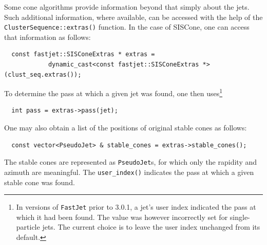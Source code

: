 \documentclass[12pt,a4]{article}
\newcommand{\fastjet}{\texttt{FastJet}\xspace}
\newcommand{\ttt}[1]{{\small\texttt{#1}}}
\begin{document}
% 
% 
% 
% 
% 

Some cone algorithms provide information beyond that simply about the
jets.
%
Such additional information, where available, can be accessed with the
help of the \ttt{ClusterSequence::extras()} function.
%
In the case of SISCone, one can access that information as follows:
\begin{lstlisting}
  const fastjet::SISConeExtras * extras = 
            dynamic_cast<const fastjet::SISConeExtras *>(clust_seq.extras());
\end{lstlisting}
To determine the pass at which a given jet was found, one then
uses\footnote{ In versions of \fastjet prior to 3.0.1, a jet's user
  index indicated the pass at which it had been found. The
  value was however incorrectly set for single-particle
  jets. The current choice is to leave the user index unchanged from
  its default.}
\begin{lstlisting}
  int pass = extras->pass(jet);
\end{lstlisting}
%
One may also obtain a list of the positions of original stable
cones as follows:
\begin{lstlisting}
  const vector<PseudoJet> & stable_cones = extras->stable_cones();
\end{lstlisting}
The stable cones are represented as \ttt{PseudoJet}s, for which only the
rapidity and azimuth are meaningful. The \verb:user_index(): indicates
the pass at which a given stable cone was found.
\end{document}
